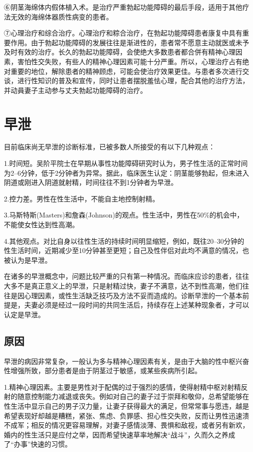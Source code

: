 \documentclass[12pt,UTF8]{ctexbook}
\begin{document}
⑥阴茎海绵体内假体植入术。是治疗严重勃起功能障碍的最后手段，适用于其他疗法无效的海绵体器质性病变的患者。

⑦心理治疗和综合治疗。心理治疗和粽合治疗，在勃起功能障碍患者康复中具有重要作用。由于勃起功能障碍的发展往往是渐进性的，患者常不愿意主动就医或未予及时有效的治疗。长久的勃起功能障碍，会使绝大多数患者都合併有精神心理因素，害怕性交失败，有些人的精神心理因素可能十分严重。所以，心理治疗占有绝对重要的地位，解除患者的精神顾虑，可能会使治疗效果更佳。与患者多次进行交谈，进行性知识的普及和宣传，同时让患者摆脱羞怯心理，配合其他的治疗方法，并动員妻子主动参与丈夫勃起功能障碍的治疗。

\chapter{早泄}

目前临床尚无早泄的诊断标准，已被多数人所接受的有以下几种观点：

1.时间短。吴阶平院士在早期从事性功能障碍研究时认为，男子性生活的正常时间为2--6分钟，低于2分钟者为异常。据此，临床医生认定：阴茎能够勃起，但未进入阴道或刚进入阴道就射精，时间往往不到1分钟者为早泄。

2.控力差。男性在性生活中，不能自主地控制射精。

3.马斯特斯(Masters)和詹森(Johnson)的观点。性生活中，男性在50\%的机会中，不能使女性达到性高潮。

4.其他观点。对比自身以往性生活的持续时间明显缩短，例如，既往20--30分钟的性生活时间，近期减少至10分钟甚至更短；自己及性伴侣对此均不满意的情况，也被认为是早泄。

在诸多的早泄概念中，问题比较严重的只有第一种情况。而临床应诊的患者，往往大多不是真正意义上的早泄，只是射精过快，妻子不满意，达不到性高潮，他们往往是因心理因素，或性生活缺乏技巧及方法不妥而造成的。诊断早泄的一个基本前提是，夫妻必须是经过一段时间的共同生活后，持续存在上述某种现象者，才可以认定是早泄。

\section{原因}

早泄的病因非常复杂，一般认为多与精神心理因素有关，是由于大脑的性中枢兴奋性增强所致，部分患者是由于阴茎过于敏感，或某些疾病所引起。

1.精神心理因素。主要是男性对于配偶的过于强烈的感情，使得射精中枢对射精反射的随意控制能力减退或丧失。例如对自己的妻子过于崇拜和敬仰，总希望能够在性生活中显示自己的男子汉力量，让妻子获得最大的满足，但常常事与愿违，越是希望表现好却越是糟糕，紧张、焦虑、负罪感、担心性交失败，反而让男性迅速溃不成军；相反的情况更容易理解，对妻子感情淡薄、畏惧和敌视，或者另有新欢，婚内的性生活只是应付之举，因而希望快速草率地解决“战斗”，久而久之养成了“办事”快速的习惯。
\end{document}
